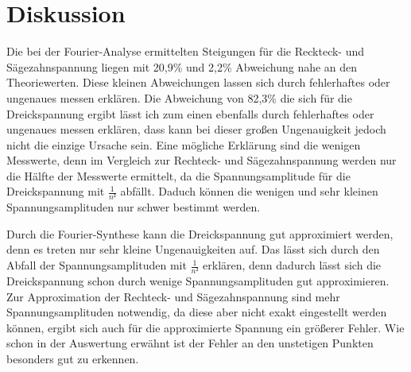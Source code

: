 \section{Diskussion}
Die bei der Fourier-Analyse ermittelten Steigungen für die Reckteck- und
Sägezahnspannung liegen mit 20,9\% und 2,2\% Abweichung nahe an den Theoriewerten.
Diese kleinen Abweichungen lassen sich durch fehlerhaftes oder ungenaues messen
erklären.
Die Abweichung von 82,3\% die sich für die Dreickspannung ergibt lässt ich zum einen
ebenfalls durch fehlerhaftes oder ungenaues messen erklären, dass kann bei dieser
großen Ungenauigkeit jedoch nicht die einzige Ursache sein.
Eine mögliche Erklärung sind die wenigen Messwerte, denn im Vergleich zur Rechteck- und
Sägezahnspannung werden nur die Hälfte der Messwerte ermittelt, da die
Spannungsamplitude für die Dreickspannung mit $\frac{1}{n²}$ abfällt. Daduch
können die wenigen und sehr kleinen Spannungsamplituden nur schwer bestimmt werden.

Durch die Fourier-Synthese kann die Dreickspannung gut approximiert werden, denn
es treten nur sehr kleine Ungenauigkeiten auf. Das lässt sich durch den Abfall
der Spannungsamplituden mit $\frac{1}{n²}$ erklären, denn dadurch lässt sich die
Dreickspannung schon durch wenige Spannungsamplituden gut approximieren.
Zur Approximation der Rechteck- und Sägezahnspannung sind mehr
Spannungsamplituden notwendig, da diese aber nicht exakt eingestellt werden können,
ergibt sich auch für die approximierte Spannung ein größerer Fehler.
Wie schon in der Auswertung erwähnt ist der Fehler an den unstetigen Punkten
besonders gut zu erkennen.

\label{sec:Diskussion}
